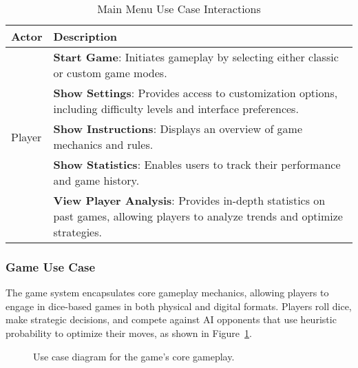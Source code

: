 \begin{table}[ht!]
    \centering
    \caption{Main Menu Use Case Interactions}
    \label{tab:main_menu_usecase}
    \begin{tabular}{|l|p{12cm}|}
        \hline
        \textbf{Actor} & \textbf{Description} \\
        \hline
               & \textbf{Start Game}: Initiates gameplay by selecting either classic or custom game modes. \\
               & \textbf{Show Settings}: Provides access to customization options, including difficulty levels and interface preferences. \\
        Player & \textbf{Show Instructions}: Displays an overview of game mechanics and rules. \\
               & \textbf{Show Statistics}: Enables users to track their performance and game history. \\
               & \textbf{View Player Analysis}: Provides in-depth statistics on past games, allowing players to analyze trends and optimize strategies. \\
        \hline
    \end{tabular}    
\end{table}

\subsubsection{Game Use Case}
The game system encapsulates core gameplay mechanics, allowing players to engage in dice-based games in both physical and digital formats. Players roll dice, make strategic decisions, and compete against AI opponents that use heuristic probability to optimize their moves, as shown in Figure~\ref{fig:game_usecase}.

\begin{figure}[ht!]
    \centering
    
    \caption{Use case diagram for the game's core gameplay.}
    \label{fig:game_usecase}
\end{figure}

